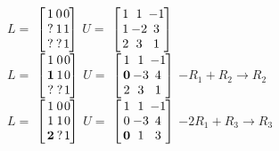 \documentclass[fontsize=5pt]{scrartcl}
\makeatletter
\newenvironment{tmatrix3}%
{ 
  $\left[\hspace{-3.5pt}\begin{array}{c@{\hspace{1pt}}@{\hspace{1pt}}c@{\hspace{1pt}}c@{\hspace{3pt}}}
}%
{
   \end{array}\hspace{-3.5pt}\right]$
}
\makeatother
\begin{document}
\begin{multicols}{3}
\begin{enumerate}
\begin{enumerate}
            $L=$
            \begin{tmatrix3}
              1 & 0 & 0 \\
              ? & 1 & 1 \\ 
              ? & ? & 1 \\
            \end{tmatrix3}%
            \vline\hspace{2pt}%
            $U=$
            \begin{tmatrix3}
              1 & 1  & -1 \\
              1 & -2 & 3  \\
              2 & 3  & 1 \\  
            \end{tmatrix3} \\
            $L=$ %
            \begin{tmatrix3}
             1 & 0 & 0 \\
             \textbf{1} & 1 & 0 \\ 
             ? & ? & 1 \\
            \end{tmatrix3}%
            \vline\hspace{2pt}%
            $U=$
            \begin{tmatrix3}
              1 & 1  & -1 \\
              \textbf{0} & -3 & 4  \\
              2 & 3  & 1 
            \end{tmatrix3}%
             $-R_1+R_2\rightarrow R_2$ \\
            $L=$ %
            \begin{tmatrix3}
             1 & 0 & 0 \\
             1 & 1 & 0 \\ 
             \mathbf{2} & ? & 1 \\
            \end{tmatrix3}%
            \vline\hspace{2pt}%
            $U=$
            \begin{tmatrix3}
              1 & 1  & -1 \\
              0 & -3 & 4  \\
              \mathbf{0} & 1  & 3 
            \end{tmatrix3}%
             $-2R_1+R_3\rightarrow R_3$ \\

\end{enumerate}
\end{enumerate}
\end{multicols}
\end{document}
